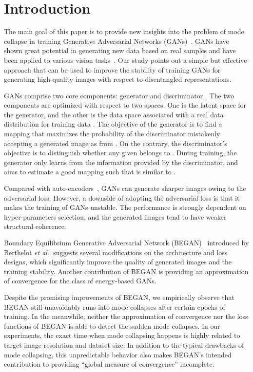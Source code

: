 \documentclass[runningheads]{llncs}
\makeatletter
\DeclareRobustCommand\onedot{\futurelet\@let@token\@onedot}
\def\@onedot{\ifx\@let@token.\else.\null\fi\xspace}
\def\etal{\emph{et al}\onedot}
\makeatother
\begin{document}
\section{Introduction}
    
    The main goal of this paper is to provide new insights into the problem of mode collapse in training Generative Adversarial Networks (GANs)~\cite{GAN}. GANs have shown great potential in generating new data based on real samples and have been applied to various vision tasks~\cite{BousmalisSDEK17,DaiFUL17,GwakCGCS17,LedigTHCCAATTWS17,LiLY017,ShrivastavaPTSW17,SoulySS17,TzengHSD17}. Our study points out a simple but effective approach that can be used to improve the stability of training GANs for generating high-quality images with respect to disentangled representations.  
    
    GANs comprise two core components: generator  and discriminator . The two components are optimized with respect to two spaces. One is the latent space  for the generator, and the other is the data space  associated with a real data distribution  for training data . The objective of the generator is to find a mapping  that maximizes the probability of the discriminator mistakenly accepting a generated image  as from . On the contrary, the discriminator's objective is to distinguish whether any given  belongs to . During training, the generator only learns from the information provided by the discriminator, and aims to estimate a good mapping such that  is similar to .
    
    Compared with auto-encoders~\cite{AutoEncoder}, GANs can generate sharper images owing to the adversarial loss. However, a downside of adopting the adversarial loss is that it makes the training of GANs unstable. The performance is strongly dependent on hyper-parameters selection, and the generated images tend to have weaker structural coherence.
   
    Boundary Equilibrium Generative Adversarial Network (BEGAN)~\cite{BEGAN} introduced by Berthelot \etal suggests several modifications on the architecture and loss designs, which significantly improve the quality of generated images and the training stability. Another contribution of BEGAN is providing an approximation of convergence for the class of energy-based GANs.
    
    Despite the promising improvements of BEGAN, we empirically observe that BEGAN still unavoidably runs into mode collapses after certain epochs of training. In the meanwhile, neither the approximation of convergence nor the loss functions of BEGAN is able to detect the sudden mode collapses. In our experiments, the exact time when mode collapsing happens is highly related to target image resolution and dataset size. In addition to the typical drawbacks of mode collapsing, this unpredictable behavior also makes BEGAN's intended contribution to providing ``global measure of convergence'' incomplete.
\end{document}

